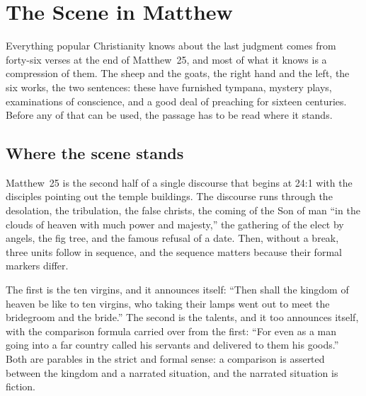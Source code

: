 \section{The Scene in Matthew}\label{sec:matthew}

Everything popular Christianity knows about the last judgment comes from forty-six verses at the end of Matthew~25, and most of what it knows is a compression of them. The sheep and the goats, the right hand and the left, the six works, the two sentences: these have furnished tympana, mystery plays, examinations of conscience, and a good deal of preaching for sixteen centuries. Before any of that can be used, the passage has to be read where it stands.

\subsection{Where the scene stands}

Matthew~25 is the second half of a single discourse that begins at 24:1 with the disciples pointing out the temple buildings. The discourse runs through the desolation, the tribulation, the false christs, the coming of the Son of man ``in the clouds of heaven with much power and majesty,'' the gathering of the elect by angels, the fig tree, and the famous refusal of a date. Then, without a break, three units follow in sequence, and the sequence matters because their formal markers differ.

The first is the ten virgins, and it announces itself: ``Then shall the kingdom of heaven be like to ten virgins, who taking their lamps went out to meet the bridegroom and the bride.'' The second is the talents, and it too announces itself, with the comparison formula carried over from the first: ``For even as a man going into a far country called his servants and delivered to them his goods.'' Both are parables in the strict and formal sense: a comparison is asserted between the kingdom and a narrated situation, and the narrated situation is fiction.

